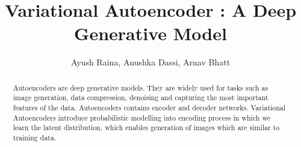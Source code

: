 \documentclass[10pt,a4paper,twoside]{tau-book}
\title{Variational Autoencoder : A Deep Generative Model}
\author{Ayush Raina, Anushka Dassi, Arnav Bhatt}
\begin{document}
\maketitle
\thispagestyle{firststyle}

\begin{abstract}
    Autoencoders are deep generative models. They are widely used for tasks such as image generation, data compression, denoising and capturing the most important features of the data. Autoencoders contains encoder and decoder networks. Variational Autoencoders introduce probabilistic modelling into encoding process in which we learn the latent distribution, which enables generation of images which are similar to training data.
\end{abstract}
\end{document}
